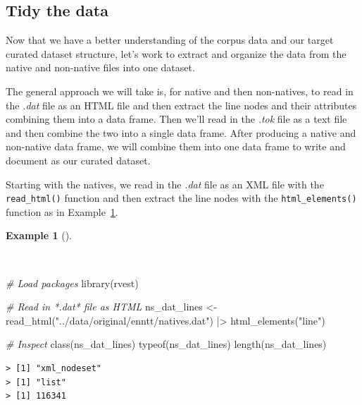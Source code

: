 \documentclass[
  letterpaper,
  DIV=11,
  numbers=noendperiod]{scrreport}
\newenvironment{Shaded}{\begin{snugshade}}{\end{snugshade}}
\newcommand{\CommentTok}[1]{\textcolor[rgb]{0.00,0.00,0.00}{\textit{#1}}}
\newcommand{\FunctionTok}[1]{\textcolor[rgb]{0.00,0.00,0.00}{#1}}
\newcommand{\NormalTok}[1]{\textcolor[rgb]{0.00,0.00,0.00}{#1}}
\newcommand{\OtherTok}[1]{\textcolor[rgb]{0.00,0.00,0.00}{#1}}
\newcommand{\SpecialCharTok}[1]{\textcolor[rgb]{0.00,0.00,0.00}{#1}}
\newcommand{\StringTok}[1]{\textcolor[rgb]{0.00,0.00,0.00}{#1}}
\theoremstyle{definition}
\newtheorem{example}{Example}[chapter]
\theoremstyle{remark}
\begin{document}
\hypertarget{tidy-the-data-1}{%
\subsection{Tidy the data}\label{tidy-the-data-1}}

Now that we have a better understanding of the corpus data and our
target curated dataset structure, let's work to extract and organize the
data from the native and non-native files into one dataset.

The general approach we will take is, for native and then non-natives,
to read in the \emph{.dat} file as an HTML file and then extract the
line nodes and their attributes combining them into a data frame. Then
we'll read in the \emph{.tok} file as a text file and then combine the
two into a single data frame. After producing a native and non-native
data frame, we will combine them into one data frame to write and
document as our curated dataset.

Starting with the natives, we read in the \emph{.dat} file as an XML
file with the \texttt{read\_html()} function and then extract the line
nodes with the \texttt{html\_elements()} function as in
Example~\ref{exm-cd-enntt-read-xml}.

\begin{example}[]\protect\hypertarget{exm-cd-enntt-read-xml}{}\label{exm-cd-enntt-read-xml}

~

\begin{Shaded}
\begin{Highlighting}[]
\CommentTok{\# Load packages}
\FunctionTok{library}\NormalTok{(rvest)}

\CommentTok{\# Read in *.dat* file as HTML}
\NormalTok{ns\_dat\_lines }\OtherTok{\textless{}{-}}
  \FunctionTok{read\_html}\NormalTok{(}\StringTok{"../data/original/enntt/natives.dat"}\NormalTok{) }\SpecialCharTok{|\textgreater{}}
  \FunctionTok{html\_elements}\NormalTok{(}\StringTok{"line"}\NormalTok{)}

\CommentTok{\# Inspect}
\FunctionTok{class}\NormalTok{(ns\_dat\_lines)}
\FunctionTok{typeof}\NormalTok{(ns\_dat\_lines)}
\FunctionTok{length}\NormalTok{(ns\_dat\_lines)}
\end{Highlighting}
\end{Shaded}

\begin{verbatim}
> [1] "xml_nodeset"
> [1] "list"
> [1] 116341
\end{verbatim}

\end{example}
\end{document}
